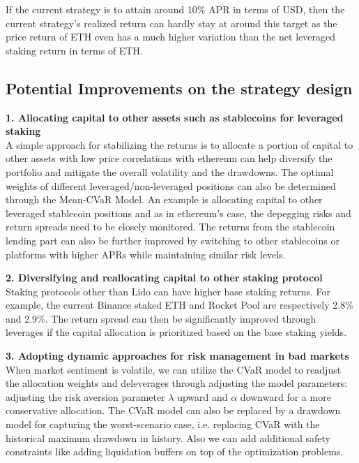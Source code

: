 \documentclass[11pt, a4paper]{article}
\begin{document}
If the current strategy is to attain around 10\% APR in terms of USD, then the current strategy's realized return can hardly stay at around this target as the price return of ETH even has a much higher variation than the net leveraged staking return in terms of ETH.

\subsection*{Potential Improvements on the strategy design}

\textbf{1. Allocating capital to other assets such as stablecoins for leveraged staking} \\
A simple approach for stabilizing the returns is to allocate a portion of capital to other assets with low price correlations with ethereum can help diversify the portfolio and mitigate the overall volatility and the drawdowns. The optimal weights of different leveraged/non-leveraged positions can also be determined through the Mean-CVaR Model. An example is allocating capital to other leveraged stablecoin positions and as in ethereum's case, the depegging risks and return spreads need to be closely monitored. The returns from the stablecoin lending part can also be further improved by switching to other stablecoins or platforms with higher APRs while maintaining similar risk levels.

\textbf{2. Diversifying and reallocating capital to other staking protocol} \\
Staking protocols other than Lido can have higher base staking returns. For example, the current Binance staked ETH and Rocket Pool are respectively 2.8\% and 2.9\%. The return spread can then be significantly improved through leverages if the capital allocation is prioritized based on the base staking yields.

\textbf{3. Adopting dynamic approaches for risk management in bad markets} \\
When market sentiment is volatile, we can utilize the CVaR model to readjust the allocation weights and deleverages through adjusting the model parameters: adjusting the risk aversion parameter $\lambda$ upward and $\alpha$ downward for a more conservative allocation. The CVaR model can also be replaced by a drawdown model for capturing the worst-scenario case, i.e. replacing CVaR with the historical maximum drawdown in history. Also we can add additional safety constraints like adding liquidation buffers on top of the optimization problems.
\end{document}
